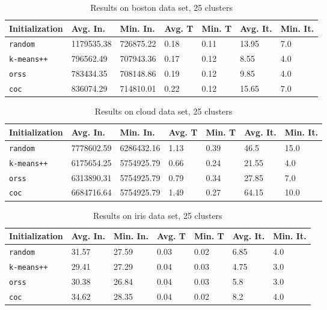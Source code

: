 \begin{table}[p]
	\begin{center}
		\begin{tabular}{|l|l|l|l|l|l|l|}
			\hline
			Initialization & Avg. In. & Min. In. & Avg. T & Min. T & Avg. It. & Min. It.\\\hline
			\texttt{random} & 1179535.38 & 726875.22 & 0.18 & 0.11 & 13.95 & 7.0\\\hline
			\texttt{k-means++} & 796562.49 & 707943.36 & 0.17 & 0.12 & 8.55 & 4.0\\\hline
			\texttt{orss} & 783434.35 & 708148.86 & 0.19 & 0.12 & 9.85 & 4.0\\\hline
			\texttt{coc} & 836074.29 & 714810.01 & 0.22 & 0.12 & 15.65 & 7.0\\\hline
		\end{tabular}
		\caption{Results on boston data set, 25 clusters}
		\label{tbl:boston25}
	\end{center}
\end{table}

\begin{table}[p]
	\begin{center}
		\begin{tabular}{|l|l|l|l|l|l|l|}
			\hline
			Initialization & Avg. In. & Min. In. & Avg. T & Min. T & Avg. It. & Min. It.\\\hline
			\texttt{random} & 7778602.59 & 6286432.16 & 1.13 & 0.39 & 46.5 & 15.0\\\hline
			\texttt{k-means++} & 6175654.25 & 5754925.79 & 0.66 & 0.24 & 21.55 & 4.0\\\hline
			\texttt{orss} & 6313890.31 & 5754925.79 & 0.79 & 0.34 & 27.85 & 7.0\\\hline
			\texttt{coc} & 6684716.64 & 5754925.79 & 1.49 & 0.27 & 64.15 & 10.0\\\hline
		\end{tabular}
		\caption{Results on cloud data set, 25 clusters}
		\label{tbl:cloud25}
	\end{center}
\end{table}

\begin{table}[p]
	\begin{center}
		\begin{tabular}{|l|l|l|l|l|l|l|}
			\hline
			Initialization & Avg. In. & Min. In. & Avg. T & Min. T & Avg. It. & Min. It.\\\hline
			\texttt{random} & 31.57 & 27.59 & 0.03 & 0.02 & 6.85 & 4.0\\\hline
			\texttt{k-means++} & 29.41 & 27.29 & 0.04 & 0.03 & 4.75 & 3.0\\\hline
			\texttt{orss} & 30.38 & 26.84 & 0.04 & 0.03 & 5.8 & 3.0\\\hline
			\texttt{coc} & 34.62 & 28.35 & 0.04 & 0.02 & 8.2 & 4.0\\\hline
		\end{tabular}
		\caption{Results on iris data set, 25 clusters}
		\label{tbl:iris25}
	\end{center}
\end{table}

